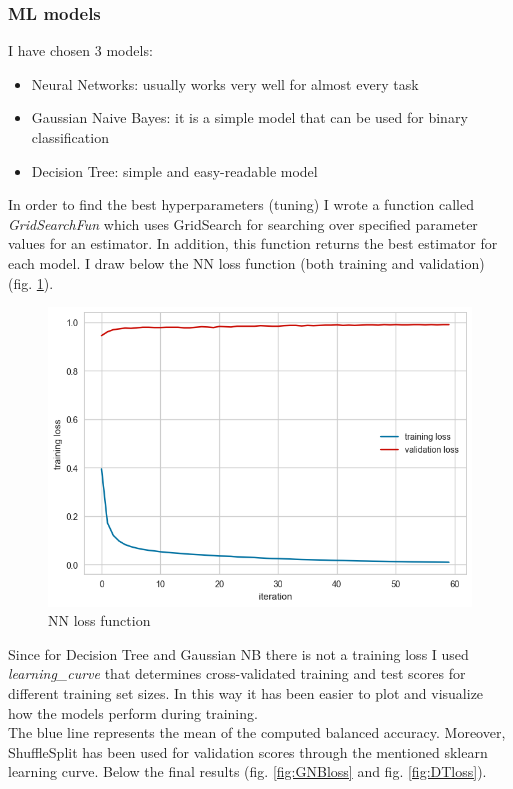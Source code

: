 \documentclass[unicode,11pt,a4paper,oneside,numbers=endperiod,openany]{scrartcl}
\begin{document}
\subsubsection*{ML models}
I have chosen 3 models:
\begin{itemize}
  \item Neural Networks: usually works very well for almost every task
  \item Gaussian Naive Bayes: it is a simple model that can be used for binary classification
  \item Decision Tree: simple and easy-readable model
\end{itemize}
In order to find the best hyperparameters (tuning) I wrote a function called \textit{GridSearchFun} which uses GridSearch for searching over specified parameter values for an estimator. In addition, this function returns the best estimator for each model. 
I draw below the NN loss function 
(both training and validation) (fig. \ref{fig:NN}).
\begin{figure}[H]
  \includegraphics[scale=0.6]{images/NNlossFun.png}
  \centering
  \caption{NN loss function}
  \label{fig:NN}
\end{figure}
Since for Decision Tree and Gaussian NB there is not a training loss I used \textit{learning\_curve} that determines cross-validated training and test scores for different training set sizes. In this way it has been easier to plot and visualize how the models perform during training. \\
The blue line represents the mean of the computed balanced accuracy. Moreover, ShuffleSplit has been used for validation scores through the mentioned sklearn learning curve. Below the final results (fig. \ref{fig:GNBloss} and fig. \ref{fig:DTloss}). 
\end{document}
